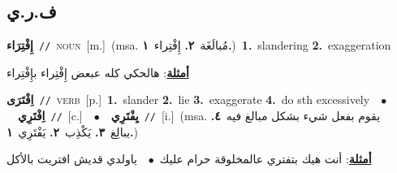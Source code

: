 \documentclass[10pt,a4paper,twoside]{article} %
\begin{document}
\begin{multicols}{2}
\vspace{-3mm}
\subsection*{\color{blue}\foreignlanguage{arabic}{ف.ر.ي}\color{blue}{}} 

{\setlength\topsep{0pt}\textbf{\foreignlanguage{arabic}{إِفْتِرَاء}}\ {\color{gray}\texttt{//}\color{black}}\ \textsc{noun}\ [m.]\ \color{gray}(msa. \foreignlanguage{arabic}{مُبالَغَة}~\foreignlanguage{arabic}{\textbf{٢.}}  \foreignlanguage{arabic}{إِفْتِراء}~\foreignlanguage{arabic}{\textbf{١.}})\color{black}\ \textbf{1.}~slandering  \textbf{2.}~exaggeration\  \begin{flushright}\color{gray}\foreignlanguage{arabic}{\textbf{\underline{\foreignlanguage{arabic}{أمثلة}}}: هالحكي كله عبعض إِفْتِراء بإِفْتِراء}\end{flushright}\color{black}} \vspace{2mm}

{\setlength\topsep{0pt}\textbf{\foreignlanguage{arabic}{اِفْتَرَى}}\ {\color{gray}\texttt{//}\color{black}}\ \textsc{verb}\ [p.]\ \textbf{1.}~slander  \textbf{2.}~lie  \textbf{3.}~exaggerate  \textbf{4.}~do sth excessively\ \ $\bullet$\ \ \setlength\topsep{0pt}\textbf{\foreignlanguage{arabic}{اِفْتَرِي}}\ {\color{gray}\texttt{//}\color{black}}\ [c.]\ \ $\bullet$\ \ \setlength\topsep{0pt}\textbf{\foreignlanguage{arabic}{يِفْتَرِي}}\ {\color{gray}\texttt{//}\color{black}}\ [i.]\ \color{gray}(msa. \foreignlanguage{arabic}{يقوم بفعل شيء بشكل مبالغ فيه}~\foreignlanguage{arabic}{\textbf{٤.}}  \foreignlanguage{arabic}{يبالِغ}~\foreignlanguage{arabic}{\textbf{٣.}}  \foreignlanguage{arabic}{يَكْذِب}~\foreignlanguage{arabic}{\textbf{٢.}}  \foreignlanguage{arabic}{يَفْتَرِي}~\foreignlanguage{arabic}{\textbf{١.}})\color{black}\  \begin{flushright}\color{gray}\foreignlanguage{arabic}{\textbf{\underline{\foreignlanguage{arabic}{أمثلة}}}: أنت هيك بتفتري عالمخلوقة حرام عليك\ $\bullet$\ \  ياولدي قديش افتريت بالأكل}\end{flushright}\color{black}} \vspace{2mm}


\end{multicols}
\end{document}
